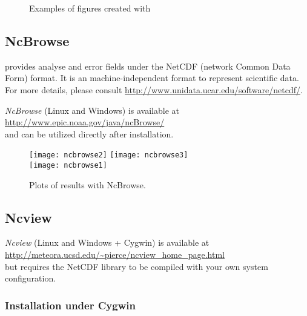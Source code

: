 \begin{figure}[H]
\centering
{}
\caption{Examples of figures created with \matlab}
\end{figure}


\subsection{NcBrowse}

\diva provides analyse and error fields under the NetCDF (network Common Data Form) format. It is an machine-independent format to represent scientific data. For more details, please consult \url{http://www.unidata.ucar.edu/software/netcdf/}.

\textsl{NcBrowse} (Linux and Windows) is available at\\
\url{http://www.epic.noaa.gov/java/ncBrowse/}\\
and can be utilized directly after installation.


\begin{figure}[htpb]
\centering
\texttt{[image: ncbrowse2]}\hspace{.5cm} \texttt{[image: ncbrowse3]} \\
\vspace{.5cm}
\texttt{[image: ncbrowse1]} 
\caption{Plots of results with NcBrowse.}
\end{figure}


\subsection{Ncview}

\textsl{Ncview} (Linux and Windows + Cygwin) is available at\\
\url{http://meteora.ucsd.edu/~pierce/ncview_home_page.html}\\
but requires the NetCDF library to be compiled with your own system configuration.


\subsubsection{Installation under Cygwin}

